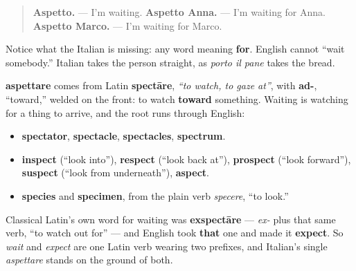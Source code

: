 \begin{quote}
\textbf{Aspetto.} — I'm waiting. \textbf{Aspetto Anna.} — I'm waiting for Anna. \textbf{Aspetto Marco.} — I'm waiting for Marco.
\end{quote}

Notice what the Italian is missing: any word meaning \textbf{for}. English cannot \textquotedblleft{}wait somebody.\textquotedblright{} Italian takes the person straight, as \emph{porto il pane} takes the bread.

\begin{cousinweb}
\textbf{aspettare} comes from Latin \textbf{spectāre}, \emph{\textquotedblleft{}to watch, to gaze at\textquotedblright{}}, with \textbf{ad-}, \textquotedblleft{}toward,\textquotedblright{} welded on the front: to watch \textbf{toward} something. Waiting is watching for a thing to arrive, and the root runs through English:

\begin{itemize}
\raggedright
  \item \textbf{spectator}, \textbf{spectacle}, \textbf{spectacles}, \textbf{spectrum}.
  \item \textbf{inspect} (\textquotedblleft{}look into\textquotedblright{}), \textbf{respect} (\textquotedblleft{}look back at\textquotedblright{}), \textbf{prospect} (\textquotedblleft{}look forward\textquotedblright{}), \textbf{suspect} (\textquotedblleft{}look from underneath\textquotedblright{}), \textbf{aspect}.
  \item \textbf{species} and \textbf{specimen}, from the plain verb \emph{specere}, \textquotedblleft{}to look.\textquotedblright{}
\end{itemize}

Classical Latin's own word for waiting was \textbf{exspectāre} — \emph{ex-} plus that same verb, \textquotedblleft{}to watch out for\textquotedblright{} — and English took \textbf{that} one and made it \textbf{expect}. So \emph{wait} and \emph{expect} are one Latin verb wearing two prefixes, and Italian's single \emph{aspettare} stands on the ground of both.
\end{cousinweb}

